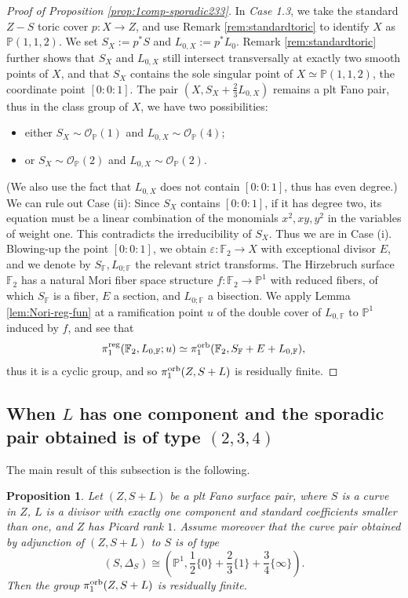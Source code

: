 \documentclass{amsart}
\newcommand{\pp}{\mathbb{P}}
\newtheorem{proposition}[theorem]{Proposition}
\theoremstyle{definition}
\theoremstyle{remark}
\numberwithin{equation}{section}
\begin{document}
\begin{proof}[Proof of Proposition \ref{prop:1comp-sporadic233}]
In {\it Case 1.3}, we take the standard $Z - S$ toric cover $p:X\to Z$, and use Remark \ref{rem:standardtoric} to identify $X$ as $\pp(1,1,2)$. We set $S_X:=p^*S$ and $L_{0,X} := p^*L_0$. Remark \ref{rem:standardtoric} further shows that $S_X$ and $L_{0,X}$ still intersect transversally at exactly two smooth points of $X$, and that $S_X$ contains the sole singular point of $X\simeq\pp(1,1,2)$, the coordinate point $[0:0:1]$. The pair $(X,S_X+\frac{2}{3}L_{0,X})$ remains a plt Fano pair, thus in the class group of $X$, we have two possibilities:
\begin{itemize}
    \item either $S_X\sim \mathcal{O}_{\pp}(1)$ and $L_{0,X}\sim \mathcal{O}_{\pp}(4)$;
    \item or $S_X\sim \mathcal{O}_{\pp}(2)$ and $L_{0,X}\sim \mathcal{O}_{\pp}(2)$.
\end{itemize}
(We also use the fact that $L_{0,X}$ does not contain $[0:0:1]$, thus has even degree.) 
We can rule out Case (ii): Since $S_X$ contains $[0:0:1]$, if it has degree two, its equation must be a linear combination of the monomials $x^2,xy,y^2$ in the variables of weight one. This contradicts the irreducibility of $S_X$.
Thus we are in Case (i). Blowing-up the point $[0:0:1]$, we obtain $\varepsilon:\mathbb{F}_2\to X$ with exceptional divisor $E$, and we denote by $S_{\mathbb{F}},L_{0;\mathbb{F}}$ the relevant strict transforms. The Hirzebruch surface $\mathbb{F}_2$ has a natural Mori fiber space structure $f:\mathbb{F}_2\to \pp^1$ with reduced fibers, of which $S_{\mathbb{F}}$ is a fiber, $E$ a section, and $L_{0;\mathbb{F}}$ a bisection. We apply Lemma \ref{lem:Nori-reg-fun} at a ramification point $u$ of the double cover of $L_{0,\mathbb{F}}$ to $\pp^1$ induced by $f$, and see that
$$\pi_1^{\rm reg}(\mathbb{F}_2, L_{0,\mathbb{F}} ; u)\simeq \pi_1^{\rm orb}(\mathbb{F}_2, S_{\mathbb{F}} + E + L_{0,\mathbb{F}}),$$
thus it is a cyclic group, and so $\pi_1^{\rm orb}(Z,S+L)$ is residually finite.
\end{proof}


\subsection{When $L$ has one component and the sporadic pair obtained is of type $(2,3,4)$}

The main result of this subsection is the following.

\begin{proposition}\label{prop:1comp-sporadic234}
Let $(Z,S+L)$ be a plt Fano surface pair, where
$S$ is a curve in $Z$, $L$ is a divisor with exactly one component and standard coefficients smaller than one, and $Z$ has Picard rank $1$. Assume moreover 
that the curve pair obtained by adjunction of $(Z,S+L)$ to $S$ is of type
$$(S,\Delta_S)\cong \left(\pp^1,\frac{1}{2}\{0\}+\frac{2}{3}\{1\}+\frac{3}{4}\{\infty\}\right).$$
Then the group $\pi_1^{\rm orb}(Z,S+L)$ is residually finite.
\end{proposition}
\end{document}
